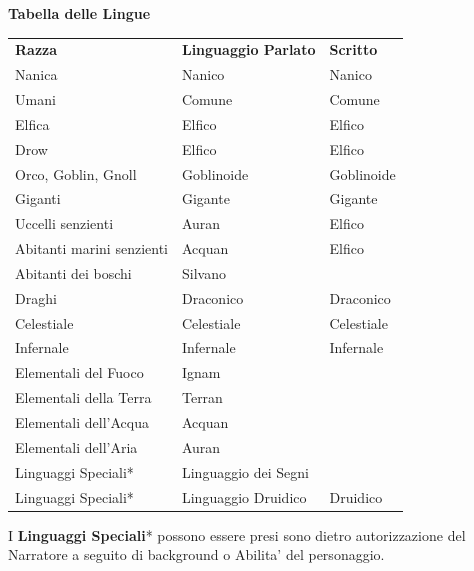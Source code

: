 \documentclass[a4paper,11pt,twoside,openany]{book}
\begin{document}
\bigskip

\textbf{Tabella delle Lingue}

\medskip

\begin{tabular}{lll}
	\toprule
	\textbf{Razza}            & \textbf{Linguaggio Parlato} & \textbf{Scritto}\\
	Nanica                    & Nanico			            & Nanico\\
	Umani                     & Comune                      & Comune\\
	Elfica                    & Elfico                      & Elfico\\
	Drow                      & Elfico			            & Elfico\\
	Orco, Goblin, Gnoll       & Goblinoide                  & Goblinoide\\
	Giganti                   & Gigante                     & Gigante\\
	Uccelli senzienti         & Auran                       & Elfico\\
	Abitanti marini senzienti & Acquan                      & Elfico\\
	Abitanti dei boschi       & Silvano                     & \\
	Draghi                    & Draconico                   & Draconico\\
	Celestiale                & Celestiale                  & Celestiale\\
	Infernale                 & Infernale                   & Infernale\\
	Elementali del Fuoco      & Ignam                       & \\
	Elementali della Terra    & Terran                      & \\
	Elementali dell'Acqua     & Acquan                      & \\
	Elementali dell'Aria	  & Auran                       & \\
	Linguaggi Speciali*		  & Linguaggio dei Segni        & \\ 
	Linguaggi Speciali*		  & Linguaggio Druidico			& Druidico\\ 
\end{tabular}

\bigskip

\begin{note}
I \textbf{Linguaggi Speciali}* possono essere presi sono dietro autorizzazione del Narratore a seguito di background o Abilita' del personaggio.
\end{note}
\end{document}
